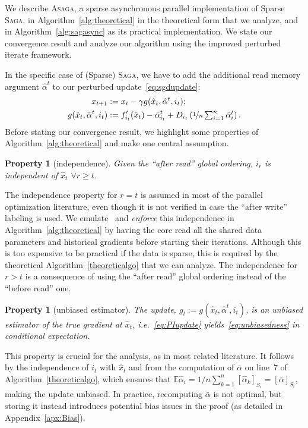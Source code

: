 \documentclass[twoside, 11pt]{article}
\newcommand{\stepsize}{\gamma}
\newcommand{\E}{\mathbb{E}}
\newcommand{\ASAGA}{\textsc{Asaga}}
\newcommand{\SAGA}{\textsc{Saga}}
\newtheorem{prop}[theorem]{Property}
\begin{document}
We describe \ASAGA, a sparse asynchronous parallel implementation of Sparse \SAGA, in Algorithm~\ref{alg:theoretical} in the theoretical form that we analyze, and in Algorithm~\ref{alg:sagasync} as its practical implementation.
We state our convergence result and analyze our algorithm using the improved perturbed iterate framework.

In the specific case of (Sparse) \SAGA, we have to add the additional read memory argument $\hat{\alpha}^t$ to our perturbed update~\eqref{eq:sgdupdate}:
\begin{equation}  \label{eq:PIupdate}
\begin{aligned}
x_{t+1} &:= x_t -\stepsize g(\hat x_t, \hat \alpha^t, i_t);
\\
g(\hat x_t, \hat \alpha^t, i_t) &:= f'_{i_t}(\hat x_t) - \hat \alpha_{i_t}^t + D_{i_t} \left({\textstyle \nicefrac{1}{n} \sum_{i=1}^n \hat{\alpha}_i^t }\right).
\end{aligned}
\end{equation}
Before stating our convergence result, we highlight some properties of Algorithm~\ref{alg:theoretical} and make one central assumption.

\begin{prop} [independence]
Given the ``after read'' global ordering, $i_r$ is independent of $\hat{x}_t$ $\forall r \geq t$.
\label{independence}
\end{prop}
The independence property for $r = t$ is assumed in most of the parallel optimization literature, even though it is not verified in case the ``after write'' labeling is used.
We emulate~\citet{mania} and \emph{enforce} this independence in Algorithm~\ref{alg:theoretical} by having the core read all the shared data parameters and historical gradients before starting their iterations.
Although this is too expensive to be practical if the data is sparse, this is required by the theoretical Algorithm~\ref{theoreticalgo} that we can analyze.
The independence for $r > t$ is a consequence of using the ``after read'' global ordering instead of the ``before read'' one.

\begin{prop}[unbiased estimator] \label{prop:unbiased}
The update, $g_t := g(\hat x_t, \hat \alpha^t, i_t)$, is an unbiased estimator of the true gradient at $\hat x_t$, i.e.~\eqref{eq:PIupdate} yields~\eqref{eq:unbiasedness} in conditional expectation.
\end{prop}
This property is crucial for the analysis, as in most related literature.
It follows by the independence of $i_t$ with $\hat{x}_t$ and from the computation of $\bar \alpha$ on line~7 of Algorithm~\ref{theoreticalgo}, which ensures that $\E \hat \alpha_i = 1/n \sum_{k=1}^n [\hat \alpha_k]_{S_i} = [\bar \alpha]_{S_i}$, making the update unbiased. In practice, recomputing $\bar \alpha$ is not optimal, but storing it instead introduces potential bias issues in the proof (as detailed in Appendix~\ref{apx:Bias}).
\end{document}
